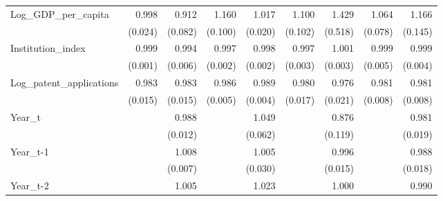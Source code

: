 \begin{table}[htbp]
\begin{tabular}{l*{8}{D{.}{.}{-1}}}
Log\_GDP\_per\_capita  &       0.998         &       0.912         &       1.160\sym{*}  &       1.017         &       1.100         &       1.429         &       1.064         &       1.166         \\
                    &     (0.024)         &     (0.082)         &     (0.100)         &     (0.020)         &     (0.102)         &     (0.518)         &     (0.078)         &     (0.145)         \\
Institution\_index   &       0.999         &       0.994         &       0.997         &       0.998         &       0.997         &       1.001         &       0.999         &       0.999         \\
                    &     (0.001)         &     (0.006)         &     (0.002)         &     (0.002)         &     (0.003)         &     (0.003)         &     (0.005)         &     (0.004)         \\
Log\_patent\_applications&       0.983         &       0.983         &       0.986\sym{***}&       0.989\sym{**} &       0.980         &       0.976         &       0.981\sym{**} &       0.981\sym{**} \\
                    &     (0.015)         &     (0.015)         &     (0.005)         &     (0.004)         &     (0.017)         &     (0.021)         &     (0.008)         &     (0.008)         \\
Year\_t              &                     &       0.988         &                     &       1.049         &                     &       0.876         &                     &       0.981         \\
                    &                     &     (0.012)         &                     &     (0.062)         &                     &     (0.119)         &                     &     (0.019)         \\
Year\_t-1            &                     &       1.008         &                     &       1.005         &                     &       0.996         &                     &       0.988         \\
                    &                     &     (0.007)         &                     &     (0.030)         &                     &     (0.015)         &                     &     (0.018)         \\
Year\_t-2            &                     &       1.005         &                     &       1.023         &                     &       1.000         &                     &       0.990         \\

\end{tabular}
\end{table}
